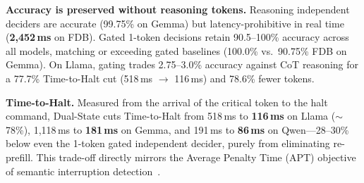 \documentclass{article}
\begin{document}
\begin{table}[t]
\centering
\caption{\textbf{Interruption accuracy and latency.} Mean decision latency on FDB; Time-to-Halt on true positives. Full tables with confusion matrices and FLEXI latencies in Appendix~\ref{app:full_tables}.}
\label{tab:main_results}
\renewcommand{\arraystretch}{0.88}
\end{table}

\textbf{Accuracy is preserved without reasoning tokens.} Reasoning independent deciders are accurate (99.75\% on Gemma) but latency-prohibitive in real time (\textbf{2{,}452\,ms} on FDB). Gated 1-token decisions retain 90.5--100\% accuracy across all models, matching or exceeding gated baselines (100.0\% vs.\ 90.75\% FDB on Gemma). On Llama, gating trades 2.75--3.0\% accuracy against CoT reasoning for a 77.7\% Time-to-Halt cut (518\,ms $\to$ 116\,ms) and 78.6\% fewer tokens.

\textbf{Time-to-Halt.} Measured from the arrival of the critical token to the halt command, Dual-State cuts Time-to-Halt from 518\,ms to \textbf{116\,ms} on Llama ($\sim$78\%), 1{,}118\,ms to \textbf{181\,ms} on Gemma, and 191\,ms to \textbf{86\,ms} on Qwen---28--30\% below even the 1-token gated independent decider, purely from eliminating re-prefill. This trade-off directly mirrors the Average Penalty Time (APT) objective of semantic interruption detection~\citep{xia2026sidbench}.
\end{document}

